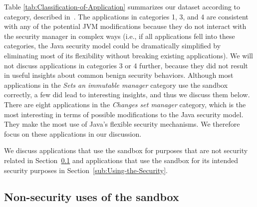 \documentclass{sig-alternate}
\begin{document}
% 
Table \ref{tab:Classification-of-Application} summarizes our dataset according to category, described
in~. The applications in categories 1, 3, and 4 
are consistent with any of the potential JVM
modifications because they do not interact with the
security manager in complex ways (i.e., if all applications fell into these
categories, the Java security model could be dramatically simplified by
eliminating most of its flexibility without breaking existing
applications).   We will
not discuss applications in categories 3 or 4 further, because they did not
result in useful insights about common benign security
behaviors. Although most applications in the \emph{Sets an immutable
  manager} category use the sandbox correctly, a few did lead to interesting
insights, and thus we discuss them below. 
%
There are eight applications in the \emph{Changes set manager} category, which
is the most interesting in terms of possible modifications to the Java security
model.  %
They make the most use of Java's flexible security
mechanisms.  We therefore focus   
on these applications in our discussion. 

We discuss applications that use the sandbox for
purposes that are not security related in Section~\ref{sub:Non-security-uses-of}
and applications that use the sandbox for its intended security purposes in
Section~\ref{sub:Using-the-Security}.

\subsection{Non-security uses of the sandbox}\label{sub:Non-security-uses-of}
\end{document}
